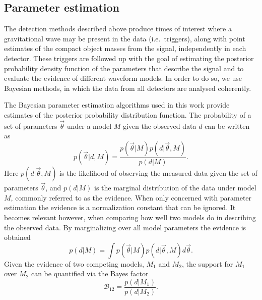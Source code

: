 \subsection{Parameter estimation}
\label{ssec:PE_pipelines}

The detection methods described above produce times of interest where a
gravitational wave may be present in the data (i.e.\ triggers), along with point
estimates of the compact object masses from the signal, independently in each 
detector. These triggers are followed up with the goal of
estimating the posterior probability density function of the parameters
that describe the signal and to evaluate the evidence of different
waveform models. In order to do so, we use Bayesian methods, in which
the data from all detectors are analysed coherently.

The Bayesian parameter estimation
algorithms used in this work provide estimates of the posterior probability 
distribution function.
The probability of a set of parameters $\vec{\theta}$ under a model $M$ given
the observed data $d$ can be written as
\begin{equation}
    \label{posterior}
    p(\vec{\theta}|d,M) = \frac{p(\vec{\theta}|M)p(d|\vec{\theta},M)}{p(d|M)}.
\end{equation}
Here $p(d|\vec{\theta},M)$ is the likelihood of observing the measured data
given the set of parameters $\vec{\theta}$, and $p(d|M)$ is the marginal
distribution of the data under model $M$, commonly referred to as the evidence.
When only concerned with parameter estimation the evidence is a normalization
constant that can be ignored.  It becomes relevant however, when comparing how
well two models do in describing the observed data.  By marginalizing over all
model parameters the evidence is obtained
\begin{equation}
    \label{evidence}
    p(d|M) = \int p(\vec{\theta}|M)p(d|\vec{\theta},M) d\vec{\theta}.
\end{equation}
Given the evidence of two competing models, $M_1$ and $M_2$, the support for
$M_1$ over $M_2$ can be quantified via the Bayes factor
\begin{equation}
    \label{bayesFactor}
    \mathcal{B}_{12} = \frac{p(d|M_1)}{p(d|M_2)}.
\end{equation}

